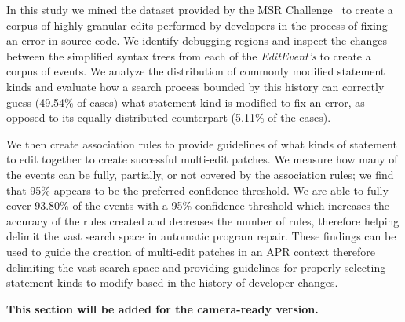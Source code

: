 \documentclass[sigconf]{acmart}
\newcommand{\todo}[1]
  {{\scriptsize \textbf{\color{red} {#1}}}}
\begin{document}
In this study we mined the dataset provided by the MSR Challenge~\cite{msr18challenge}
to create a corpus of highly granular edits performed by developers in the process
of fixing an error in source code. We identify debugging
regions and inspect the changes between the simplified 
syntax trees from each
of the \textit{EditEvent's} to create a corpus of 
events.
We analyze the distribution of commonly modified statement kinds and evaluate
how a search process bounded by this history can correctly guess (49.54\% of 
cases) what statement kind is modified to fix an error, as opposed to its
equally distributed counterpart (5.11\% of the cases).

We then create association rules to provide guidelines of what kinds of
statement to edit together to create successful multi-edit patches. 
We measure how many of the events
can be fully, partially, or not covered by the association rules; we find that
95\% appears to be the preferred confidence threshold.
We are able to fully cover 93.80\% of the events with a 95\% confidence threshold
which increases the accuracy of the rules created and decreases the 
number of rules, therefore helping delimit the vast search space 
in automatic program repair. These findings can be used to guide the 
creation of multi-edit patches in an APR context therefore delimiting
the vast search space and providing guidelines for properly selecting
statement kinds to modify based in the history of developer changes.




\begin{acks}
\todo{ This section will be added for the camera-ready version.}

\end{acks}




\end{document}

